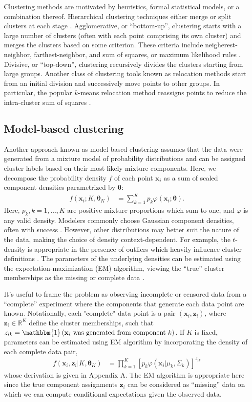\documentclass{uwstat572}
\newcommand*\reals{\mathbb{R}}
\newcommand*\ba{\[ \begin{aligned}}
\newcommand*\ea{\end{aligned} \]}
\newcommand*\ind[1]{\mathbbm{1}\left(#1\right)}
\newcommand*\bx{\mathbf{x}}
\newcommand*\bz{\mathbf{z}}
\newcommand*\btheta{\boldsymbol{\theta}}
\renewcommand\;{\,}
\renewcommand\phi{\varphi}
\begin{document}
Clustering methods are motivated by heuristics, formal statistical models, or a combination thereof.
Hierarchical clustering techniques either merge or split clusters at each stage \citep{Fraley98}.
Agglomerative, or ``bottom-up'', clustering starts with a large number of clusters (often with each point comprising its own cluster) and merges the clusters based on some criterion.
These criteria include neigherest-neighbor, farthest-neighbor, and sum of squares, or maximum likelihood rules \citep{Kaufman90, Murtagh84, Banfield93}.
Divisive, or ``top-down'', clustering recursively divides the clusters starting from large groups. 
Another class of clustering tools known as relocation methods start from an initial division and successively move points to other groups.
In particular, the popular $k$-means relocation method reassigns points to reduce the intra-cluster sum of squares \citep{Hartigan78}. 

\subsection{Model-based clustering}

Another approach known as model-based clustering assumes that the data were generated from a mixture model of probability distributions and can be assigned cluster labels based on their most likely mixture components.
Here, we decompose the probability density $f$ of each point $\bx_i$ as a sum of scaled component densities parametrized by $\btheta$:
\ba
f(\bx_i ; K, \btheta_K)
	& = \sum_{k=1}^K p_k \phi(\bx_i ; \btheta).
\ea
Here, $p_k, k = 1, \dotsc, K$ are positive mixture proportions which sum to one, and $\phi$ is any valid density.
Modelers commonly choose Gaussian component densities, often with success \citep{Murtagh84, Banfield93, Dasgupta98, Campbell97, Celeux95, Mukerjee98}.
However, other distributions may better suit the nature of the data, making the choice of density context-dependent.
For example, the $t$-density is appropriate in the presence of outliers which heavily influence cluster definitions \citep{Peel00}.
The parameters of the underlying densities can be estimated using the expectation-maximization (EM) algorithm, viewing the ``true'' cluster memberships as the missing or complete data \citep{McLachlan88, Dempster77}. 


It's useful to frame the problem as observing incomplete or censored data from a ``complete'' experiment where the components that generate each data point are known. Notationally, each "complete" data point is a pair $(\bx_i, \bz_i)$, where 
$\bz_i \in \reals^K$ define the cluster memberships, such that $z_{ik} = \ind{\bx_i \text{ was generated from component $k$}}$.  
If $K$ is fixed, parameters can be estimated using EM algorithm by incorporating the density of each complete data pair,
\ba
f(\bx_i, \bz_i | K, \btheta_K)
	& = \prod_{k=1}^K \left[ p_k \phi(\bx_i | \mu_k, \Sigma_k) \right]^{z_{ik}}
\ea
whose derivation is given in Appendix A.
The EM algorithm is appropriate here since the true component assignments $\bz_i$ can be considered as ``missing'' data on which we can compute conditional expectations given the observed data.
\end{document}
